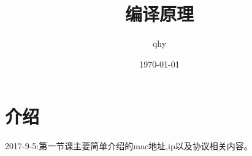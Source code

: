 \documentclass[UTF8,a4paper]{ctexart}
\author{ qhy }
\date{\today}
\title{编译原理}
\begin{document}
  \maketitle
  \tableofcontents
  \newpage

  \section{介绍}
  2017-9-5:第一节课主要简单介绍的mac地址,ip以及协议相关内容。

  
\end{document}
